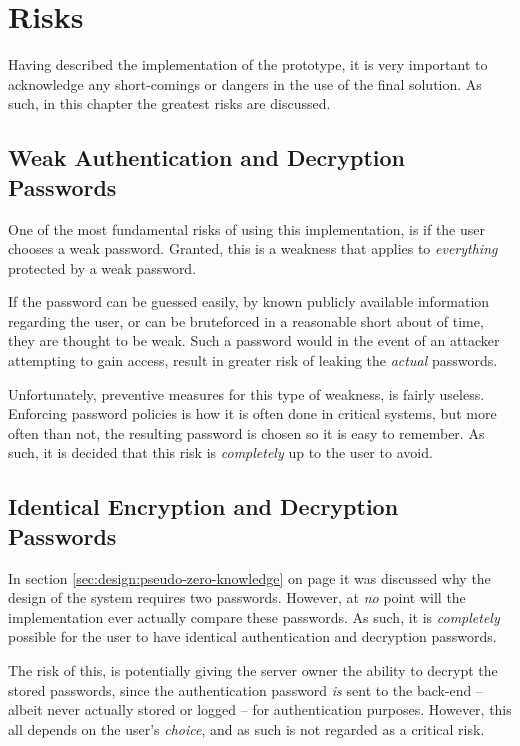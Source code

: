 \chapter{Risks}
	Having described the implementation of the prototype, it is very important to acknowledge any short-comings or dangers in the use of the final solution. As such, in this chapter the greatest risks are discussed.
	

	\section{Weak Authentication and Decryption Passwords}
		One of the most fundamental risks of using this implementation, is if the user chooses a weak password. Granted, this is a weakness that applies to \emph{everything} protected by a weak password.

		If the password can be guessed easily, by known publicly available information regarding the user, or can be bruteforced in a reasonable short about of time, they are thought to be weak. Such a password would in the event of an attacker attempting to gain access, result in greater risk of leaking the \emph{actual} passwords.

		Unfortunately, preventive measures for this type of weakness, is fairly useless. Enforcing password policies is how it is often done in critical systems, but more often than not, the resulting password is chosen so it is easy to remember. As such, it is decided that this risk is \emph{completely} up to the user to avoid.

	\section{Identical Encryption and Decryption Passwords}
		In section \ref{sec:design:pseudo-zero-knowledge} on page \pageref{sec:design:pseudo-zero-knowledge} it was discussed why the design of the system requires two passwords. However, at \emph{no} point will the implementation ever actually compare these passwords. As such, it is \emph{completely} possible for the user to have identical authentication and decryption passwords.

		The risk of this, is potentially giving the server owner the ability to decrypt the stored passwords, since the authentication password \emph{is} sent to the back-end -- albeit never actually stored or logged -- for authentication purposes. However, this all depends on the user's \emph{choice}, and as such is not regarded as a critical risk.
	
